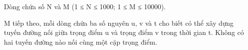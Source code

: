 Dòng chứa số N và M (1 ≤ N ≤ 1000; 1 ≤ M ≤ 10000).  

   M tiếp theo, mỗi dòng chứa ba số nguyên u, v và t cho biết có thể xây dựng tuyến đường nối giữa trọng điểm u và trọng điểm v trong thời gian t. Không có hai tuyến đường nào nối cùng một cặp trọng điểm.